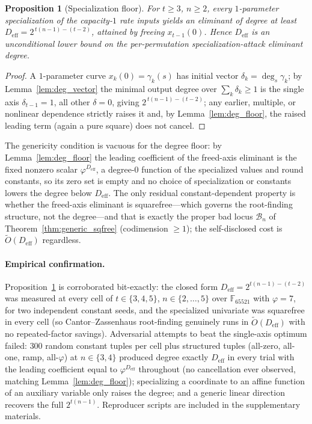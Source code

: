 \documentclass[11pt,a4paper]{article}
\newtheorem{proposition}[theorem]{Proposition}
\theoremstyle{definition}
\newcommand{\F}{\mathbb{F}}
\begin{document}
\begin{proposition}[Specialization floor]\label{prop:deff_floor}
For $t\ge 3$, $n\ge 2$, every $1$-parameter specialization of the
capacity-$1$ rate inputs yields an eliminant of degree at least
$D_{\mathrm{eff}}=2^{\,t(n-1)-(t-2)}$, attained by freeing
$x_{t-1}(0)$. Hence $D_{\mathrm{eff}}$ is an unconditional lower bound
on the per-permutation specialization-attack eliminant degree.
\end{proposition}

\begin{proof}
A $1$-parameter curve $x_k(0)=\gamma_k(s)$ has initial vector
$\delta_k=\deg_s\gamma_k$; by Lemma~\ref{lem:deg_vector} the minimal
output degree over $\sum_k\delta_k\ge 1$ is the single axis
$\delta_{t-1}=1$, all other $\delta=0$, giving $2^{\,t(n-1)-(t-2)}$;
any earlier, multiple, or nonlinear dependence strictly raises it and,
by Lemma~\ref{lem:deg_floor}, the raised leading term (again a pure
square) does not cancel.
\end{proof}

The genericity condition is vacuous for the degree floor: by
Lemma~\ref{lem:deg_floor} the leading coefficient of the freed-axis
eliminant is the fixed nonzero scalar $\varphi^{D_{\mathrm{eff}}}$, a
degree-$0$ function of the specialized values and round constants, so
its zero set is empty and no choice of specialization or constants
lowers the degree below $D_{\mathrm{eff}}$. The only residual
constant-dependent property is whether the freed-axis eliminant is
squarefree---which governs the root-finding structure, not the
degree---and that is exactly the proper bad locus $\mathcal{B}_n$ of
Theorem~\ref{thm:generic_sqfree} (codimension $\ge 1$); the
self-disclosed cost is $\widetilde{O}(D_{\mathrm{eff}})$ regardless.

\paragraph{Empirical confirmation.}
Proposition~\ref{prop:deff_floor} is corroborated bit-exactly: the
closed form $D_{\mathrm{eff}} = 2^{t(n-1)-(t-2)}$ was measured at every
cell of $t \in \{3, 4, 5\}$, $n \in \{2, \ldots, 5\}$ over
$\F_{65521}$ with $\varphi = 7$, for two independent constant seeds,
and the specialized univariate was squarefree in every cell (so
Cantor--Zassenhaus root-finding genuinely runs in
$\widetilde{O}(D_{\mathrm{eff}})$ with no repeated-factor savings).
Adversarial attempts to beat the single-axis optimum failed: $300$
random constant tuples per cell plus structured tuples (all-zero,
all-one, ramp, all-$\varphi$) at $n \in \{3, 4\}$ produced degree
exactly $D_{\mathrm{eff}}$ in every trial with the leading coefficient
equal to $\varphi^{D_{\mathrm{eff}}}$ throughout (no cancellation ever
observed, matching Lemma~\ref{lem:deg_floor}); specializing a
coordinate to an affine function of an auxiliary variable only raises
the degree; and a generic linear direction recovers the full
$2^{t(n-1)}$. Reproducer scripts are included in the supplementary
materials.
\end{document}
